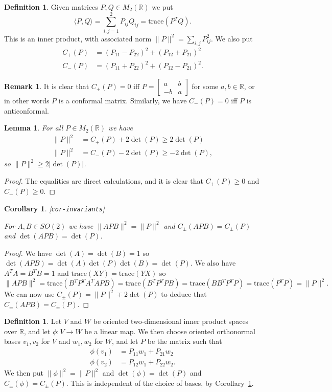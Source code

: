 \documentclass[reqno]{amsart}
\newcommand{\lbl}[1]{\label{#1}\textup{[\texttt{#1}]}\par}
\newcommand{\lbl}{\label}
\newcommand{\R}         {{\mathbb{R}}}
\newcommand{\ip}[1]     {\langle #1\rangle}
\newcommand{\bbm}       {\left[\begin{matrix}}
\newcommand{\ebm}       {\end{matrix}\right]}
\renewcommand{\:}{\colon}
\newtheorem{lemma}[theorem]{Lemma}
\newtheorem{corollary}[theorem]{Corollary}
\theoremstyle{definition}
\newtheorem{remark}[theorem]{Remark}
\newtheorem{definition}[theorem]{Definition}
\begin{document}
\begin{definition}
 Given matrices $P,Q\in M_2(\R)$ we put
 \[ \ip{P,Q} = \sum_{i,j=1}^2 P_{ij}Q_{ij} = \text{trace}(P^TQ). \]
 This is an inner product, with associated norm
 $\|P\|^2=\sum_{i,j}P_{ij}^2$.  We also put
 \begin{align*}
  C_+(P) &= (P_{11}-P_{22})^2 + (P_{12}+P_{21})^2 \\
  C_-(P) &= (P_{11}+P_{22})^2 + (P_{12}-P_{21})^2.
 \end{align*}
\end{definition}
\begin{remark}
 It is clear that $C_+(P)=0$ iff $P=\bbm a&b\\ -b&a\ebm$ for some
 $a,b\in\R$, or in other words $P$ is a conformal matrix.  Similarly,
 we have $C_-(P)=0$ iff $P$ is anticonformal.
\end{remark}
\begin{lemma}
 For all $P\in M_2(\R)$ we have
 \begin{align*}
  \|P\|^2 &= C_+(P) + 2\det(P) \geq 2\det(P) \\
  \|P\|^2 &= C_-(P) - 2\det(P) \geq -2\det(P),
 \end{align*}
 so $\|P\|^2\geq 2|\det(P)|$.
\end{lemma}
\begin{proof}
 The equalities are direct calculations, and it is clear that
 $C_+(P)\geq 0$ and $C_-(P)\geq 0$.
\end{proof}

\begin{corollary}\lbl{cor-invariants}
 For $A,B\in SO(2)$ we have $\|APB\|^2=\|P\|^2$ and
 $C_{\pm}(APB)=C_{\pm}(P)$ and $\det(APB)=\det(P)$.
\end{corollary}
\begin{proof}
 We have $\det(A)=\det(B)=1$ so
 $\det(APB)=\det(A)\det(P)\det(B)=\det(P)$.  We also have
 $A^TA=B^TB=1$ and $\text{trace}(XY)=\text{trace}(YX)$ so
 \[ \|APB\|^2 = \text{trace}(B^TP^TA^TAPB)
     = \text{trace}(B^TP^TPB)
     = \text{trace}(BB^TP^TP)
     = \text{trace}(P^TP) = \|P\|^2.
 \]
 We can now use $C_{\pm}(P)=\|P\|^2\mp 2\det(P)$ to deduce that
 $C_{\pm}(APB)=C_{\pm}(P)$.
\end{proof}

\begin{definition}
 Let $V$ and $W$ be oriented two-dimensional inner product spaces over
 $\R$, and let $\phi\:V\to W$ be a linear map.  We then choose
 oriented orthonormal bases $v_1,v_2$ for $V$ and $w_1,w_2$ for $W$,
 and let $P$ be the matrix such that
 \begin{align*}
  \phi(v_1) &= P_{11}w_1 + P_{21}w_2 \\
  \phi(v_2) &= P_{12}w_1 + P_{22}w_2.
 \end{align*}
 We then put $\|\phi\|^2=\|P\|^2$ and $\det(\phi)=\det(P)$ and
 $C_{\pm}(\phi)=C_{\pm}(P)$.  This is independent of the choice of
 bases, by Corollary~\ref{cor-invariants}.
\end{definition}
\end{document}
